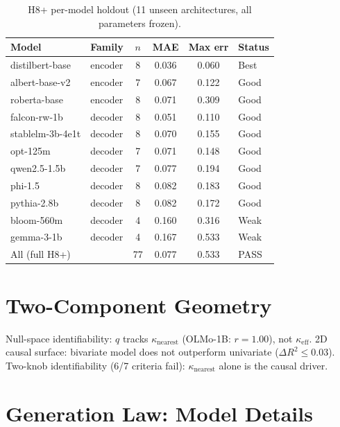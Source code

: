 \documentclass{article}
\begin{document}
\begin{table}[h]
\centering
\caption{H8+ per-model holdout (11 unseen architectures, all parameters frozen).}
\label{tab:h8plus-detail}
\small
\begin{tabular}{llcccl}
\toprule
Model & Family & $n$ & MAE & Max err & Status \\
\midrule
distilbert-base & encoder & 8 & 0.036 & 0.060 & Best \\
albert-base-v2 & encoder & 7 & 0.067 & 0.122 & Good \\
roberta-base & encoder & 8 & 0.071 & 0.309 & Good \\
falcon-rw-1b & decoder & 8 & 0.051 & 0.110 & Good \\
stablelm-3b-4e1t & decoder & 8 & 0.070 & 0.155 & Good \\
opt-125m & decoder & 7 & 0.071 & 0.148 & Good \\
qwen2.5-1.5b & decoder & 7 & 0.077 & 0.194 & Good \\
phi-1.5 & decoder & 8 & 0.082 & 0.183 & Good \\
pythia-2.8b & decoder & 8 & 0.082 & 0.172 & Good \\
bloom-560m & decoder & 4 & 0.160 & 0.316 & Weak \\
gemma-3-1b & decoder & 4 & 0.167 & 0.533 & Weak \\
\midrule
\multicolumn{2}{l}{All (full H8+)} & 77 & 0.077 & 0.533 & PASS \\
\bottomrule
\end{tabular}
\end{table}

\section{Two-Component Geometry}
\label{app:twocomp-details}
Null-space identifiability: $q$ tracks $\kappa_\mathrm{nearest}$ (OLMo-1B: $r=1.00$), not $\kappa_\mathrm{eff}$. 2D causal surface: bivariate model does not outperform univariate ($\Delta R^2\leq0.03$). Two-knob identifiability (6/7 criteria fail): $\kappa_\mathrm{nearest}$ alone is the causal driver.

\section{Generation Law: Model Details}
\label{app:generation-law}
\end{document}
